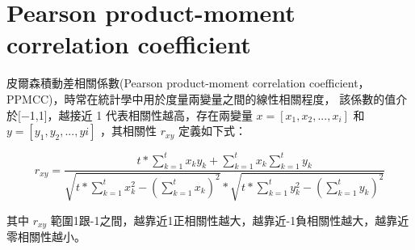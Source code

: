 \chapter{Pearson product-moment correlation coefficient}
\label{chapter:intro}
皮爾森積動差相關係數(Pearson product-moment correlation coefficient，PPMCC)，時常在統計學中用於度量兩變量之間的線性相關程度， 該係數的值介於[−1,1]，越接近 1 代表相關性越高，存在兩變量 \(x=[x_1,x_2,...,x_i]\) 和 \(y=[y_1,y_2,...,yi]\)  ，其相關性 \(r_{xy}\) 定義如下式：


$$r_{xy}=\frac{t\ast \sum_{k=1}^{t}x_ky_k+\sum_{k=1}^{t}x_k\sum_{k=1}^{t}y_k}{\sqrt{t\ast \sum_{k=1}^{t}x_k^2-(\sum_{k=1}^{t}x_k)^2}\ast\sqrt{t\ast \sum_{k=1}^{t}y_k^2-(\sum_{k=1}^{t}y_k)^2}}$$


其中 \(r_{xy}\)  範圍1跟-1之間，越靠近1正相關性越大，越靠近-1負相關性越大，越靠近零相關性越小。
    
